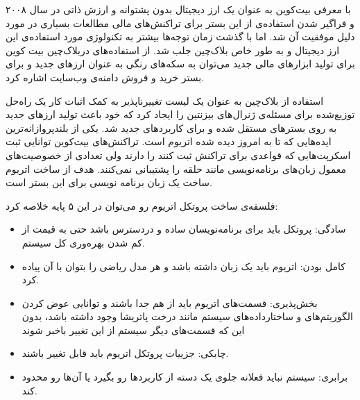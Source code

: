 \par
با معرفی بیت‌کوین به عنوان یک ارز دیجیتال بدون پشتوانه و ارزش ذاتی در سال ۲۰۰۸ و فراگیر شدن استفاده‌ی از این بستر برای تراکنش‌های مالی مطالعات بسیاری در مورد دلیل موفقیت آن شد. اما با گذشت زمان توجه‌ها بیشتر به تکنولوژی مورد استفاده‌ی این ارز دیجیتال و به طور خاص بلاک‌چین جلب شد.
از استفاده‌های دربلاک‌چین بیت کوین برای تولید ابزارهای مالی جدید می‌توان به سکه‌های رنگی به عنوان ارزهای جدید و
  برای بستر خرید و فروش دامنه‌ی وب‌سایت اشاره کرد. 
\par
استفاده از بلاک‌چین به عنوان یک لیست تغییرناپذیر به کمک اثبات کار یک راه‌حل توزیع‌شده برای مسئله‌ی ژنرال‌های بیزنتین را ایجاد کرد که خود باعث تولید ارزهای جدید به روی بسترهای مستقل شده و برای کاربردهای جدید شد. یکی از بلندپروازانه‌ترین ایده‌هایی که تا به امروز دیده شده اتریوم است. تراکنش‌های بیت‌کوین توانایی ثبت اسکرپت‌هایی که قواعدی برای تراکنش ثبت کنند را دارند ولی تعدادی از خصوصیت‌های معمول زبان‌های برنامه‌نویسی
 مانند حلقه را پشتیبانی نمی‌کنند. هدف از ساخت اتریوم ساخت یک زبان برنامه نویسی
 برای این بستر است. 
\par
فلسفه‌ی ساخت پروتکل اتریوم رو می‌توان در این ۵ پایه خلاصه کرد: 
\begin{itemize}
	\item
سادگی: پروتکل باید برای برنامه‌نویسان ساده و دردسترس باشد حتی به قیمت از کم شدن بهره‌وری کل سیستم.
\item  
کامل بودن: اتریوم باید یک زبان
  داشته باشد و هر مدل ریاضی را بتوان با آن پیاده کرد. 
\item
بخش‌پذیری: قسمت‌های اتریوم باید از هم جدا باشند و توانایی عوض کردن الگوریتم‌های و ساختارداده‌های سیستم مانند درخت پاتریشا وجود داشته باشد، بدون این که قسمت‌های دیگر سیستم از این تغییر باخبر شوند
\item
چابکی: جزییات پروتکل اتریوم باید قابل تغییر باشند. 
\item
برابری: سیستم نباید فعلانه جلوی یک دسته از کاربردها رو بگیرد یا آن‌ها رو محدود کند.
\end{itemize}
\par
